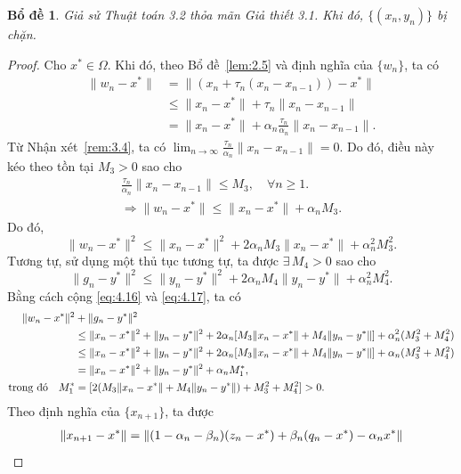 \documentclass{MyBook}
\theoremstyle{plain}
\newtheorem{lemma}[theorem]{Bổ đề}
\theoremstyle{definition}
\theoremstyle{remark}
\numberwithin{equation}{chapter}
\newcommand{\nm}[1]{\lVert #1\rVert}
\begin{document}
\begin{lemma}\label{lem:4.4}
Giả sử Thuật toán 3.2 thỏa mãn Giả thiết 3.1. Khi đó, $\{(x_n,y_n)\}$ bị chặn.
\end{lemma}

\begin{proof}
Cho $x^{*}\in\Omega$. Khi đó, theo Bổ đề~\ref{lem:2.5} và định nghĩa của $\{w_n\}$, ta có
\begin{align*}
\nm{w_n-x^{*}} &= \nm{(x_n+\tau_n(x_n-x_{n-1}))-x^{*}}\\
&\le \nm{x_n-x^{*}}+\tau_n\nm{x_n-x_{n-1}}\\
&= \nm{x_n-x^{*}}+\alpha_n\frac{\tau_n}{\alpha_n}\nm{x_n-x_{n-1}}.
\end{align*}
Từ Nhận xét~\ref{rem:3.4}, ta có $\lim_{n\to\infty}\frac{\tau_n}{\alpha_n}\nm{x_n-x_{n-1}}=0$. Do đó, điều này kéo theo tồn tại $M_3>0$ sao cho
\begin{align*}
\frac{\tau_n}{\alpha_n}\nm{x_n-x_{n-1}}\le M_3,\quad\forall n\ge 1.\\
\Longrightarrow \nm{w_n-x^{*}}\le\nm{x_n-x^{*}}+\alpha_n M_3.
\end{align*}
Do đó,
\begin{equation}
\nm{w_n-x^{*}}^2\le\nm{x_n-x^{*}}^2+2\alpha_n M_3\nm{x_n-x^{*}}+\alpha_n^2 M_3^2. \label{eq:4.16}
\end{equation}
Tương tự, sử dụng một thủ tục tương tự, ta được $\exists\,M_4>0$ sao cho
\begin{equation}
\nm{g_n-y^{*}}^2\le\nm{y_n-y^{*}}^2+2\alpha_n M_4\nm{y_n-y^{*}}+\alpha_n^2 M_4^2. \label{eq:4.17}
\end{equation}
Bằng cách cộng \eqref{eq:4.16} và \eqref{eq:4.17}, ta có
\begin{align}
\nm{w_n-x^{*}}^2 &+ \nm{g_n-y^{*}}^2\notag\\
&\le \nm{x_n-x^{*}}^2+\nm{y_n-y^{*}}^2+2\alpha_n[M_3\nm{x_n-x^{*}}+M_4\nm{y_n-y^{*}}]+\alpha_n^2(M_3^2+M_4^2)\notag\\
&\le \nm{x_n-x^{*}}^2+\nm{y_n-y^{*}}^2+2\alpha_n[M_3\nm{x_n-x^{*}}+M_4\nm{y_n-y^{*}}]+\alpha_n(M_3^2+M_4^2)\notag\\
&= \nm{x_n-x^{*}}^2+\nm{y_n-y^{*}}^2+\alpha_n M_1^{*},\notag\\
\text{trong đó}\quad M_1^{*} &= [2(M_3\nm{x_n-x^{*}}+M_4\nm{y_n-y^{*}})+M_3^2+M_4^2]>0. \label{eq:4.18}
\end{align}
Theo định nghĩa của $\{x_{n+1}\}$, ta được
\begin{align}
\nm{x_{n+1}-x^{*}} &= \nm{(1-\alpha_n-\beta_n)(z_n-x^{*})+\beta_n(q_n-x^{*})-\alpha_n x^{*}}\notag\\

\end{align}
\end{proof}
\end{document}
